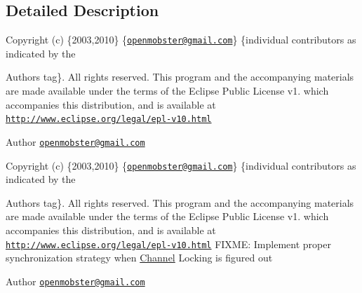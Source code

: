 \subsection{\-Detailed \-Description}
\-Copyright (c) \{2003,2010\} \{\href{mailto:openmobster@gmail.com}{\tt openmobster@gmail.\-com}\} \{individual contributors as indicated by the \begin{DoxyAuthor}{\-Authors}
tag\}. \-All rights reserved. \-This program and the accompanying materials are made available under the terms of the \-Eclipse \-Public \-License v1. which accompanies this distribution, and is available at \href{http://www.eclipse.org/legal/epl-v10.html}{\tt http\-://www.\-eclipse.\-org/legal/epl-\/v10.\-html}
\end{DoxyAuthor}
\begin{DoxyAuthor}{\-Author}
\href{mailto:openmobster@gmail.com}{\tt openmobster@gmail.\-com}
\end{DoxyAuthor}
\-Copyright (c) \{2003,2010\} \{\href{mailto:openmobster@gmail.com}{\tt openmobster@gmail.\-com}\} \{individual contributors as indicated by the \begin{DoxyAuthor}{\-Authors}
tag\}. \-All rights reserved. \-This program and the accompanying materials are made available under the terms of the \-Eclipse \-Public \-License v1. which accompanies this distribution, and is available at \href{http://www.eclipse.org/legal/epl-v10.html}{\tt http\-://www.\-eclipse.\-org/legal/epl-\/v10.\-html} \-F\-I\-X\-M\-E\-: \-Implement proper synchronization strategy when \hyperlink{interface_channel}{\-Channel} \-Locking is figured out
\end{DoxyAuthor}
\begin{DoxyAuthor}{\-Author}
\href{mailto:openmobster@gmail.com}{\tt openmobster@gmail.\-com} 
\end{DoxyAuthor}


